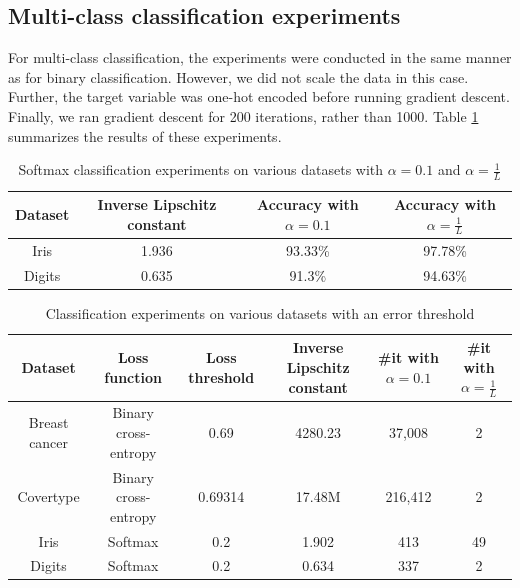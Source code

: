 \documentclass[sigconf,authordraft]{acmart}
\begin{document}
\subsection{Multi-class classification experiments}
For multi-class classification, the experiments were conducted in the same manner as for binary classification. However, we did not scale the data in this case. Further, the target variable was one-hot encoded before running gradient descent. Finally, we ran gradient descent for 200 iterations, rather than 1000. Table \ref{tab:classif:2} summarizes the results of these experiments.

\begin{table}
    \caption{Softmax classification experiments on various datasets with $\alpha=0.1$ and $\alpha=\frac{1}{L}$}
    \centering
    \begin{tabular}{cccc}
        \toprule
        Dataset & Inverse Lipschitz constant & Accuracy with $\alpha=0.1$ & Accuracy with $\alpha=\frac{1}{L}$ \\
        \midrule
        Iris & 1.936 & 93.33\% & 97.78\% \\
        Digits & 0.635 & 91.3\% & 94.63\% \\
        \bottomrule
    \end{tabular}
    \label{tab:classif:2}
\end{table}

\begin{table}
    \caption{Classification experiments on various datasets with an error threshold}
    \centering
    \begin{tabular}{cccccc}
        \toprule
        Dataset & Loss function & Loss threshold & Inverse Lipschitz constant & \#it with $\alpha=0.1$ & \#it with $\alpha=\frac{1}{L}$ \\
        \midrule
        Breast cancer & Binary cross-entropy & 0.69 & 4280.23 & 37,008 & 2 \\
        Covertype\footnotemark & Binary cross-entropy & 0.69314 & 17.48M & 216,412 & 2 \\
        Iris & Softmax & 0.2 & 1.902 & 413 & 49 \\
        Digits & Softmax & 0.2 & 0.634 & 337 & 2 \\
        \bottomrule
    \end{tabular}
    \label{tab:classif:3}
\end{table}

\end{document}
